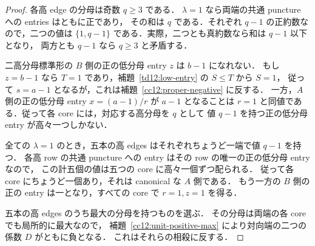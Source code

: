 \begin{proof}
各高 edge の分母は奇数 $q\geq3$ である．
$\lambda=1$ なら両端の共通 puncture への entries はともに正であり，
その和は $q$ である．それぞれ $q-1$ の正約数なので，二つの値は
$\{1,q-1\}$ である．実際，二つとも真約数なら和は $q-1$ 以下となり，
両方とも $q-1$ なら $q\geq3$ と矛盾する．

二高分母標準形の $B$ 側の正の低分母 entry $z$ は $b-1$ になれない．
もし $z=b-1$ なら $T=1$ であり，補題~\ref{td12:low-entry} の $S\leq T$ から $S=1$，
従って $s=a-1$ となるが，これは補題~\ref{cc12:proper-negative} に反する．
一方，$A$ 側の正の低分母 entry $x=(a-1)/r$ が $a-1$ となることは
$r=1$ と同値である．従って各 core には，対応する高分母を $q$ として
値 $q-1$ を持つ正の低分母 entry が高々一つしかない．

全ての $\lambda=1$ のとき，五本の高 edges はそれぞれちょうど一端で値 $q-1$ を持つ．
各高 row の共通 puncture への entry はその row の唯一の正の低分母 entry なので，
この計五個の値は五つの core に高々一個ずつ配られる．
従って各 core にちょうど一個あり，それは canonical な $A$ 側である．
もう一方の $B$ 側の正の entry は一となり，すべての core で $r=1,z=1$ を得る．

五本の高 edges のうち最大の分母を持つものを選ぶ．
その分母は両端の各 core でも局所的に最大なので，
補題~\ref{cc12:unit-positive-max} により対向端の二つの係数 $D$ がともに負となる．
これはそれらの相殺に反する．
\end{proof}

